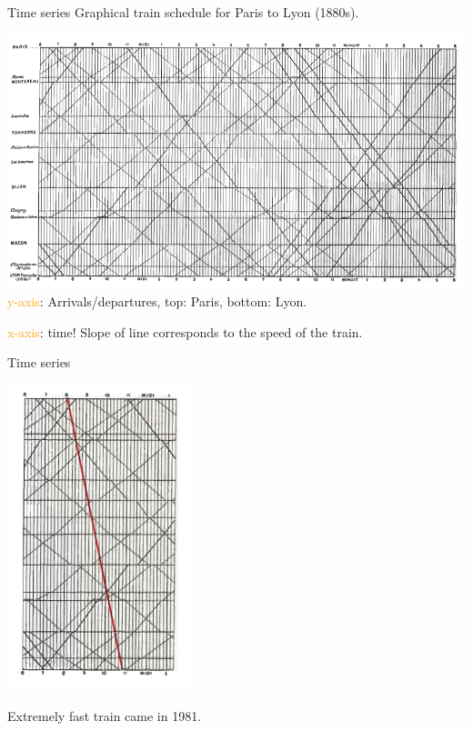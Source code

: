 \documentclass[
  ignorenonframetext,
]{beamer}
\begin{document}
\begin{frame}{Time series}
\label{time-series-3}
Graphical train schedule for Paris to Lyon (1880s).

\includegraphics[width=0.9\linewidth,height=\textheight,keepaspectratio]{excellence_figs/fig_16.png}
\textcolor{orange}{y-axis}: Arrivals/departures, top: Paris, bottom:
Lyon.

\textcolor{orange}{x-axis}: time! Slope of line corresponds to the speed
of the train.
\end{frame}

\begin{frame}{Time series}
\label{time-series-4}
\centering

\includegraphics[width=0.4\textwidth]{excellence_figs/fig_17.png}

Extremely fast train came in 1981.
\end{frame}
\end{document}
